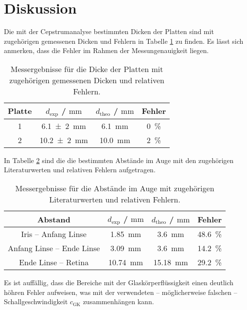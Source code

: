 \section{Diskussion}
\label{sec:Diskussion}
Die mit der Cepstrumanalyse bestimmten Dicken der Platten sind mit zugehörigen gemessenen Dicken
und Fehlern in Tabelle \ref{tab:cepstru} zu finden.
Es lässt sich anmerken, dass die Fehler im Rahmen der Messungenauigkeit liegen.
\begin{table}
	\centering
	\caption{Messergebnisse für die Dicke der Platten mit zugehörigen gemessenen Dicken und relativen Fehlern.}
	\label{tab:cepstru}
	\begin{tabular}{cccc}
	\toprule
		Platte & $d_{\mathrm{exp}}$ / $\si{\milli\meter}$ & $d_{\mathrm{theo}}$ / $\si{\milli\meter}$ & Fehler \\
	\midrule
		1 & \SI{6,1(2)}{\milli\meter} & \SI{6,1}{\milli\meter} & \SI{0}{\percent} \\
		2 & \SI{10,2(2)}{\milli\meter} & \SI{10,0}{\milli\meter} & \SI{2}{\percent} \\
	\bottomrule
	\end{tabular}
\end{table}

In Tabelle \ref{tab:augentheorie} sind die die bestimmten Abstände im Auge mit den zugehörigen
Literaturwerten und relativen Fehlern aufgetragen.
\begin{table}
	\centering
	\caption{Messergebnisse für die Abstände im Auge mit zugehörigen Literaturwerten \cite{auge} und relativen Fehlern.}
	\label{tab:augentheorie}
	\begin{tabular}{cccc}
	\toprule
		Abstand & $d_{\mathrm{exp}}$ / $\si{\milli\meter}$ & $d_{\mathrm{theo}}$ / $\si{\milli\meter}$ & Fehler \\
	\midrule
		Iris -- Anfang Linse & \SI{1,85}{\milli\meter} & \SI{3,6}{\milli\meter} & \SI{48,6}{\percent} \\
		Anfang Linse -- Ende Linse & \SI{3,09}{\milli\meter} & \SI{3,6}{\milli\meter} & \SI{14,2}{\percent} \\
		Ende Linse -- Retina & \SI{10,74}{\milli\meter} & \SI{15,18}{\milli\meter} & \SI{29,2}{\percent} \\
	\bottomrule
	\end{tabular}
\end{table}
Es ist auffällig, dass die Bereiche mit der Glaskörperflüssigkeit einen deutlich höhren 
Fehler aufweisen, was mit der verwendeten -- möglicherweise falschen --
Schallgeschwindigkeit $c_{\mathrm{GK}}$ 
zusammenhängen kann. 

